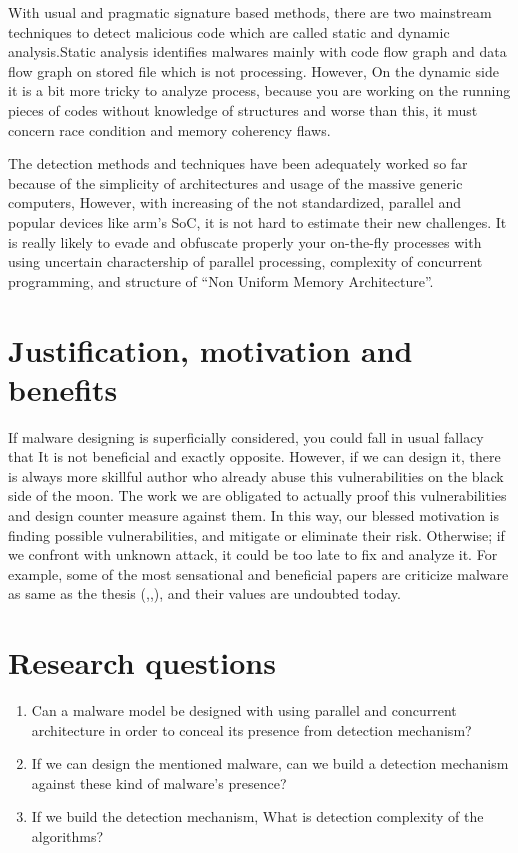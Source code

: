 \documentclass[informationsecurity]{gucmasterproject}
\begin{document}
With usual and pragmatic signature based methods, there are two mainstream techniques to detect malicious code which are called static and dynamic analysis.Static analysis identifies malwares mainly with code flow graph and data flow graph on stored file which is not processing. However, On the dynamic side it is a bit more tricky to analyze process, because you are working on the running pieces of codes without knowledge of structures and worse than this, it must concern race condition and memory coherency flaws.

The detection methods and techniques have been adequately worked so far because of the simplicity of architectures and usage of the massive generic computers, However, with increasing of the not standardized, parallel and popular devices like arm’s SoC, it is not hard to estimate their new challenges. It is really likely to evade and obfuscate properly your on-the-fly processes with using uncertain charactership of parallel processing, complexity of concurrent programming, and structure of “Non Uniform Memory Architecture”.


\section{Justification, motivation and benefits}
If malware designing is superficially considered, you could fall in usual fallacy that It is not beneficial and exactly opposite. However, if we can design it, there is always more skillful author who already abuse this vulnerabilities on the black side of the moon. The work we are obligated to actually proof this vulnerabilities and design counter measure against them. In this way, our blessed motivation is finding possible vulnerabilities, and mitigate or eliminate their risk. Otherwise; if we confront with unknown attack, it could be too late to fix and analyze it. For example, some of the most sensational and beneficial papers are criticize malware as same as the thesis (\cite{moser2007limits},\cite{cavallaro2008limits},\cite{egele2012survey}), and their values are undoubted today. 

\section{Research questions}\label{research:questions}

\begin{enumerate}
\item Can a malware model be designed with using parallel and concurrent architecture in order to conceal its presence from detection mechanism?
\item If we can design the mentioned malware, can we build a detection mechanism against these kind of malware's presence?
\item If we build the detection mechanism, What is detection complexity of the algorithms?
\end{enumerate}
\end{document}
